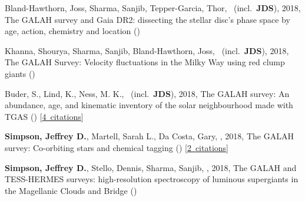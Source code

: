 \item[{\color{numcolor}\scriptsize5}] Bland-Hawthorn, Joss, Sharma, Sanjib, Tepper-Garcia, Thor, \etal\ (incl.\ \textbf{JDS}), 2018, The GALAH survey and Gaia DR2: dissecting the stellar disc's phase space by age, action, chemistry and location ()

\item[{\color{numcolor}\scriptsize4}] Khanna, Shourya, Sharma, Sanjib, Bland-Hawthorn, Joss, \etal\ (incl.\ \textbf{JDS}), 2018, The GALAH Survey: Velocity fluctuations in the Milky Way using red clump giants ()

\item[{\color{numcolor}\scriptsize3}] Buder, S., Lind, K., Ness, M. K., \etal\ (incl.\ \textbf{JDS}), 2018, The GALAH survey: An abundance, age, and kinematic inventory of the solar neighbourhood made with TGAS () [\href{https://ui.adsabs.harvard.edu/#abs/2018arXiv180405869B}{4~citations}]

\item[{\color{numcolor}\scriptsize2}] \textbf{Simpson, Jeffrey D.}, Martell, Sarah L., Da Costa, Gary, \etal, 2018, The GALAH survey: Co-orbiting stars and chemical tagging () [\href{https://ui.adsabs.harvard.edu/#abs/2018arXiv180405894S}{2~citations}]

\item[{\color{numcolor}\scriptsize1}] \textbf{Simpson, Jeffrey D.}, Stello, Dennis, Sharma, Sanjib, \etal, 2018, The GALAH and TESS-HERMES surveys: high-resolution spectroscopy of luminous supergiants in the Magellanic Clouds and Bridge ()